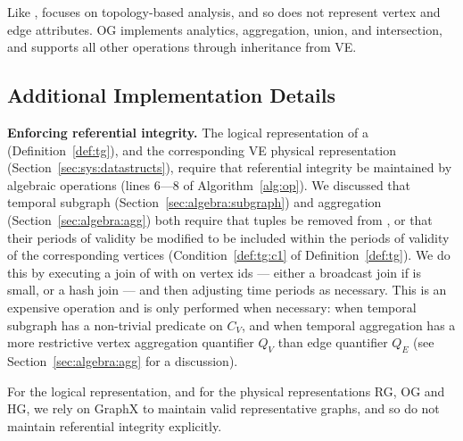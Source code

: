 Like \og, \hg focuses on topology-based analysis, and so does not
represent vertex and edge attributes. OG implements analytics,
aggregation, union, and intersection, and supports all other
operations through inheritance from VE.

\subsection{Additional Implementation Details}
\label{sec:sys:maint}

{\bf Enforcing referential integrity.}  The \tve logical
representation of a \tg (Definition~\ref{def:tg}), and the
corresponding VE physical representation
(Section~\ref{sec:sys:datastructs}), require that referential
integrity be maintained by algebraic operations (lines 6---8 of
Algorithm~\ref{alg:op}).  We discussed that temporal subgraph
(Section~\ref{sec:algebra:subgraph}) and aggregation
(Section~\ref{sec:algebra:agg}) both require that tuples be removed
from \te, or that their periods of validity be modified to be included
within the periods of validity of the corresponding vertices
(Condition~\ref{def:tg:c1} of Definition~\ref{def:tg}).  We do this by
executing a join of \te with \tv on vertex ids --- either a broadcast
join if \tv is small, or a hash join --- and then adjusting time
periods as necessary.  This is an expensive operation and is only
performed when necessary: when temporal subgraph has a non-trivial
predicate on $C_V$, and when temporal aggregation has a more
restrictive vertex aggregation quantifier $Q_V$ than edge quantifier
$Q_E$ (see Section~\ref{sec:algebra:agg} for a discussion).

For the \trg logical representation, and for the physical
representations RG, OG and HG, we rely on GraphX to maintain valid
representative graphs, and so do not maintain referential integrity
explicitly.


